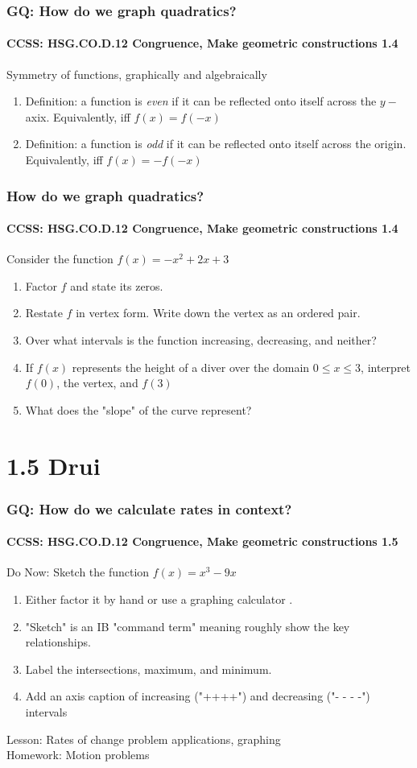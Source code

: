 \documentclass{beamer}
\begin{document}
  \frame
  {
    \frametitle{GQ: How do we graph quadratics?}
    \framesubtitle{CCSS: HSG.CO.D.12 Congruence, Make geometric constructions  \qquad \alert{1.4}}

    \begin{block}{Symmetry of functions, graphically and algebraically}
    \begin{enumerate}
        \item Definition: a function is \emph{even} if it can be reflected onto itself across the $y-$axix. Equivalently, iff $f(x)=f(-x)$
        \item Definition: a function is \emph{odd} if it can be reflected onto itself across the origin. Equivalently, iff $f(x)=-f(-x)$
    \end{enumerate}
    \end{block}
  }

  \frame
  {
    \frametitle{How do we graph quadratics?}
    \framesubtitle{CCSS: HSG.CO.D.12 Congruence, Make geometric constructions  \qquad \alert{1.4}}

    \begin{block}{Consider the function $f(x)=-x^2+2x+3$}
    \begin{enumerate}
        \item Factor $f$ and state its zeros.
        \item Restate $f$ in vertex form. Write down the vertex as an ordered pair.
        \item Over what intervals is the function increasing, decreasing, and neither?
        \item If $f(x)$ represents the height of a diver over the domain $0 \leq x \leq 3$, interpret $f(0)$, the vertex, and $f(3)$
        \item What does the "slope" of the curve represent?
    \end{enumerate}
    \end{block}
  }


  \section{1.5 Drui}
  \frame
  {
    \frametitle{GQ: How do we calculate rates in context?}
    \framesubtitle{CCSS: HSG.CO.D.12 Congruence, Make geometric constructions  \qquad \alert{1.5}}

    \begin{block}{Do Now: Sketch the function $f(x)=x^3-9x$}
      \begin{enumerate}
      \item Either factor it by hand or use a graphing calculator .
      \item "Sketch" is an IB "command term" meaning roughly show the key relationships.
      \item Label the intersections, maximum, and minimum.
      \item Add an axis caption of increasing ("++++") and decreasing ("- - - -") intervals
      \end{enumerate}
   \end{block}
    Lesson: Rates of change problem applications, graphing\\%
    Homework: Motion problems
  }

  
\end{document}
